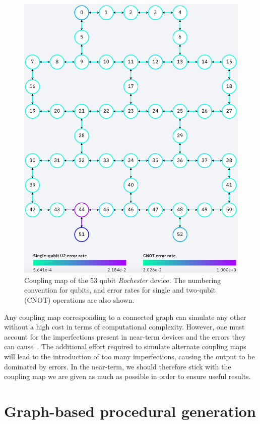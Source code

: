 \documentclass[conference]{IEEEtran}
\begin{document}
\begin{figure}[htbp]
\begin{center}
\includegraphics[width=0.95\columnwidth]{figures/rochester.png}
\caption{Coupling map of the 53 qubit \textit{Rochester} device. The numbering convention for qubits, and error rates for single and two-qubit (CNOT) operations are also shown.}
\label{rochester}
\end{center}
\end{figure}

Any coupling map corresponding to a connected graph can simulate any other without a high cost in terms of computational complexity. However, one must account for the imperfections present in near-term devices and the errors they can cause~\cite{mckay:19}. The additional effort required to simulate alternate coupling maps will lead to the introduction of too many imperfections, causing the output to be dominated by errors. In the near-term, we should therefore stick with the coupling map we are given as much as possible in order to ensure useful results.


\section{Graph-based procedural generation}
\end{document}
